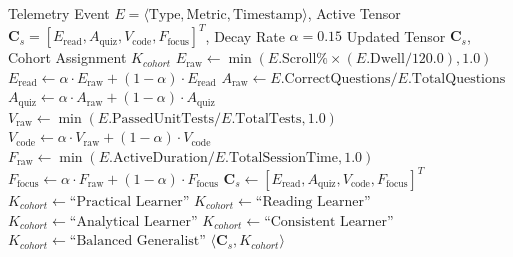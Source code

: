 \documentclass[conference]{IEEEtran}
\begin{document}
\begin{algorithm}[htbp]
\caption{Cognitive Learning Pattern Algorithm (CLPA)}
\label{alg:clpa}
\begin{algorithmic}[1]
\REQUIRE Telemetry Event $E = \langle \text{Type}, \text{Metric}, \text{Timestamp} \rangle$, Active Tensor $\mathbf{C}_s = [E_{\text{read}}, A_{\text{quiz}}, V_{\text{code}}, F_{\text{focus}}]^T$, Decay Rate $\alpha = 0.15$
\ENSURE Updated Tensor $\mathbf{C}_s$, Cohort Assignment $K_{cohort}$
    \STATE $E_{\text{raw}} \leftarrow \min(E.\text{Scroll\%} \times (E.\text{Dwell} / 120.0), 1.0)$
    \STATE $E_{\text{read}} \leftarrow \alpha \cdot E_{\text{raw}} + (1 - \alpha) \cdot E_{\text{read}}$
    \STATE $A_{\text{raw}} \leftarrow E.\text{CorrectQuestions} / E.\text{TotalQuestions}$
    \STATE $A_{\text{quiz}} \leftarrow \alpha \cdot A_{\text{raw}} + (1 - \alpha) \cdot A_{\text{quiz}}$
    \STATE $V_{\text{raw}} \leftarrow \min(E.\text{PassedUnitTests} / E.\text{TotalTests}, 1.0)$
    \STATE $V_{\text{code}} \leftarrow \alpha \cdot V_{\text{raw}} + (1 - \alpha) \cdot V_{\text{code}}$
    \STATE $F_{\text{raw}} \leftarrow \min(E.\text{ActiveDuration} / E.\text{TotalSessionTime}, 1.0)$
    \STATE $F_{\text{focus}} \leftarrow \alpha \cdot F_{\text{raw}} + (1 - \alpha) \cdot F_{\text{focus}}$
\ENDIF
\STATE $\mathbf{C}_s \leftarrow [E_{\text{read}}, A_{\text{quiz}}, V_{\text{code}}, F_{\text{focus}}]^T$
    \STATE $K_{cohort} \leftarrow \text{``Practical Learner''}$
    \STATE $K_{cohort} \leftarrow \text{``Reading Learner''}$
    \STATE $K_{cohort} \leftarrow \text{``Analytical Learner''}$
    \STATE $K_{cohort} \leftarrow \text{``Consistent Learner''}$
\ELSE
    \STATE $K_{cohort} \leftarrow \text{``Balanced Generalist''}$
\ENDIF
\RETURN $\langle \mathbf{C}_s, K_{cohort} \rangle$
\end{algorithmic}
\end{algorithm}
\end{document}
